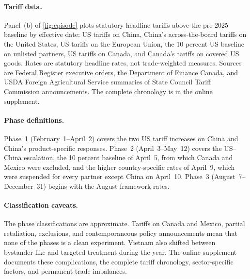 \paragraph{Tariff data.} Panel~(b) of \cref{fig:episode} plots statutory headline tariffs above the pre-2025 baseline by effective date: US tariffs on China, China's across-the-board tariffs on the United States, US tariffs on the European Union, the 10 percent US baseline on unlisted partners, US tariffs on Canada, and Canada's tariffs on covered US goods. Rates are statutory headline rates, not trade-weighted measures. Sources are Federal Register executive orders, the Department of Finance Canada, and USDA Foreign Agricultural Service summaries of State Council Tariff Commission announcements. The complete chronology is in the online supplement.

\paragraph{Phase definitions.} Phase~1 (February~1--April~2) covers the two US tariff increases on China and China's product-specific responses. Phase~2 (April~3--May~12) covers the US--China escalation, the 10 percent baseline of April~5, from which Canada and Mexico were excluded, and the higher country-specific rates of April~9, which were suspended for every partner except China on April~10. Phase~3 (August~7--December~31) begins with the August framework rates.

\paragraph{Classification caveats.} The phase classifications are approximate. Tariffs on Canada and Mexico, partial retaliation, exclusions, and contemporaneous policy announcements mean that none of the phases is a clean experiment. Vietnam also shifted between bystander-like and targeted treatment during the year. The online supplement documents these complications, the complete tariff chronology, sector-specific factors, and permanent trade imbalances.
